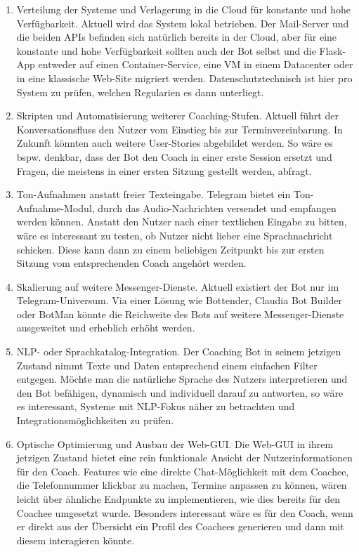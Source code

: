     \begin{enumerate}
        \item Verteilung der Systeme und Verlagerung in die Cloud für konstante und hohe Verfügbarkeit. Aktuell wird das System lokal betrieben. Der Mail-Server und die beiden APIs befinden sich natürlich bereits in der Cloud, aber für eine konstante und hohe Verfügbarkeit sollten auch der Bot selbst und die Flask-App entweder auf einen Container-Service, eine VM in einem Datacenter oder in eine klassische Web-Site migriert werden. Datenschutztechnisch ist hier pro System zu prüfen, welchen Regularien es dann unterliegt. 
        \item Skripten und Automatisierung weiterer Coaching-Stufen. Aktuell führt der Konversationsfluss den Nutzer vom Einstieg bis zur Terminvereinbarung. In Zukunft könnten auch weitere User-Stories abgebildet werden. So wäre es bspw. denkbar, dass der Bot den Coach in einer erste Session ersetzt und Fragen, die meistens in einer ersten Sitzung gestellt werden, abfragt.
        \item Ton-Aufnahmen anstatt freier Texteingabe. Telegram bietet ein Ton-Aufnahme-Modul, durch das Audio-Nachrichten versendet und empfangen werden können. Anstatt den Nutzer nach einer textlichen Eingabe zu bitten, wäre es interessant zu testen, ob Nutzer nicht lieber eine Sprachnachricht schicken. Diese kann dann zu einem beliebigen Zeitpunkt bis zur ersten Sitzung vom entsprechenden Coach angehört werden.
        \item Skalierung auf weitere Messenger-Dienste. Aktuell existiert der Bot nur im Telegram-Universum. Via einer Lösung wie Bottender, Claudia Bot Builder oder BotMan könnte die Reichweite des Bots auf weitere Messenger-Dienste ausgeweitet und erheblich erhöht werden.
        \item NLP- oder Sprachkatalog-Integration. Der Coaching Bot in seinem jetzigen Zustand nimmt Texte und Daten entsprechend einem einfachen Filter entgegen. Möchte man die natürliche Sprache des Nutzers interpretieren und den Bot befähigen, dynamisch und individuell darauf zu antworten, so wäre es interessant, Systeme mit NLP-Fokus näher zu betrachten und Integrationsmöglichkeiten zu prüfen. 
        \item Optische Optimierung und Ausbau der Web-GUI. Die Web-GUI in ihrem jetzigen Zustand bietet eine rein funktionale Ansicht der Nutzerinformationen für den Coach. Features wie eine direkte Chat-Möglichkeit mit dem Coachee, die Telefonnummer klickbar zu machen, Termine anpassen zu können, wären leicht über ähnliche Endpunkte zu implementieren, wie dies bereits für den Coachee umgesetzt wurde. Besonders interessant wäre es für den Coach, wenn er direkt aus der Übersicht ein Profil des Coachees generieren und dann mit diesem interagieren könnte.
        
    \end{enumerate}

    